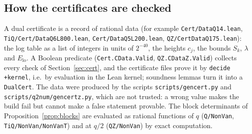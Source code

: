 \documentclass[11pt]{amsart}
\theoremstyle{definition}
\theoremstyle{remark}
\numberwithin{equation}{section}
\newcommand{\lean}[1]{{\def\_{\textunderscore\allowbreak}\texttt{#1}}}
\begin{document}
\subsection{How the certificates are checked}
A dual certificate is a record of rational data (for example \lean{Cert\slash{}DataQ14.lean},
\lean{TiQ\slash{}Cert\slash{}DataQ6L800.lean}, \lean{Cert\slash{}DataQ5L200.lean}, \lean{QZ\slash{}CertDataQ175.lean}): the log table as a list of integers in units of
$2^{-40}$, the heights $c_j$, the bounds $S_k$, $\lambda$ and $E_{\mathrm{lo}}$. A Boolean predicate (\lean{Cert.CData.Valid},
\lean{QZ.CDataZ.Valid}) collects every check of Section~\ref{sec:cert}, and the certificate files prove it by
\lean{decide +kernel}, i.e.\ by evaluation in the Lean kernel; soundness lemmas turn it into a \lean{DualCert}. The data were
produced by the scripts \lean{scripts\slash{}gen\_cert.py} and \lean{scripts\slash{}q2num\slash{}gen\_cert\_z.py}, which are not
trusted: a wrong value makes the build fail but cannot make a false statement provable. The block determinants of
Proposition~\ref{prop:blocks} are evaluated as rational functions of $q$ (\lean{Q\slash{}NonVan}, \lean{TiQ\slash{}NonVan\slash{}NonVanT})
and at $q/2$ (\lean{QZ\slash{}NonVan}) by exact computation.
\end{document}
